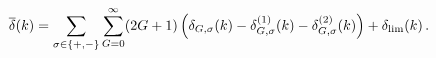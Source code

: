 \begin{equation}
\overline{\delta}(k) =  
\sum_{\sigma\in\{ +,- \}}\sum_{G=0}^\infty (2G+1)
\left(\delta_{G,\sigma}(k) - \delta^{(1)}_{G,\sigma}(k) - 
\delta^{(2)}_{G,\sigma}(k) \right) + \delta_{\rm lim}(k) \, .
\end{equation}

